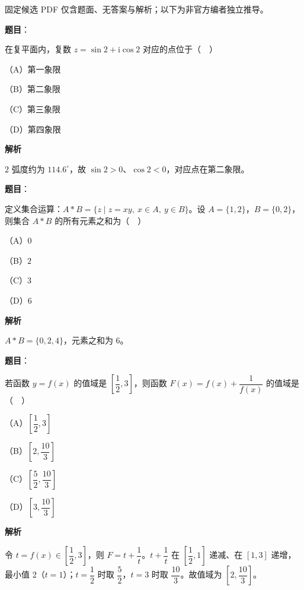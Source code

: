 

\begin{gktip}
固定候选 PDF 仅含题面、无答案与解析；以下为非官方编者独立推导。
\end{gktip}

\begin{answer}

\textbf{题目}：

在复平面内，复数 $z=\sin2+\mathrm i\cos2$ 对应的点位于（　）

（A）第一象限

（B）第二象限

（C）第三象限

（D）第四象限

\textbf{解析}

$2$ 弧度约为 $114.6^\circ$，故 $\sin2>0$、$\cos2<0$，对应点在第二象限。


\end{answer}
\begin{answer}

\textbf{题目}：

定义集合运算：$A*B=\{z\mid z=xy,\ x\in A,\ y\in B\}$。设 $A=\{1,2\}$，$B=\{0,2\}$，则集合 $A*B$ 的所有元素之和为（　）

（A）$0$

（B）$2$

（C）$3$

（D）$6$

\textbf{解析}

$A*B=\{0,2,4\}$，元素之和为 $6$。


\end{answer}
\begin{answer}

\textbf{题目}：

若函数 $y=f(x)$ 的值域是 $\left[\dfrac12,3\right]$，则函数 $F(x)=f(x)+\dfrac1{f(x)}$ 的值域是（　）

（A）$\left[\dfrac12,3\right]$

（B）$\left[2,\dfrac{10}3\right]$

（C）$\left[\dfrac52,\dfrac{10}3\right]$

（D）$\left[3,\dfrac{10}3\right]$

\textbf{解析}

令 $t=f(x)\in\left[\dfrac12,3\right]$，则 $F=t+\dfrac1t$。$t+\dfrac1t$ 在 $\left[\dfrac12,1\right]$ 递减、在 $[1,3]$ 递增，最小值 $2$（$t=1$）；$t=\dfrac12$ 时取 $\dfrac52$，$t=3$ 时取 $\dfrac{10}3$。故值域为 $\left[2,\dfrac{10}3\right]$。


\end{answer}
